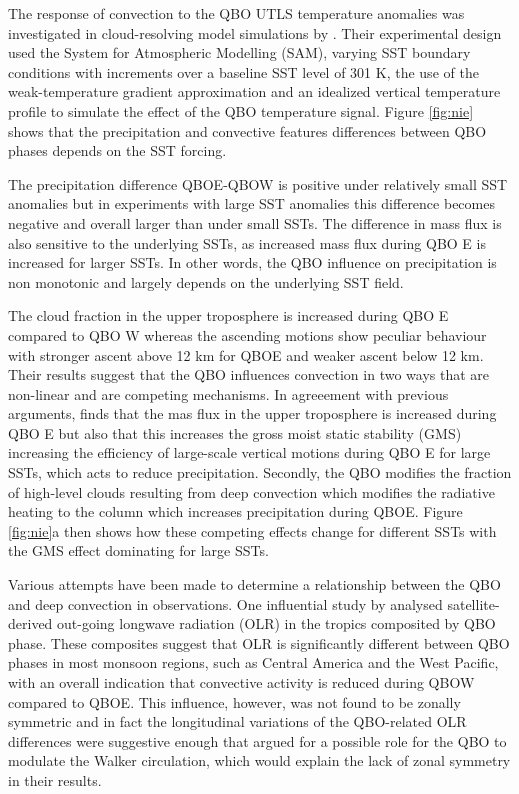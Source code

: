  The response of convection to the QBO UTLS temperature anomalies was investigated in cloud-resolving model simulations by \cite{nie2015}. Their experimental design used the System for Atmospheric Modelling (SAM), varying SST boundary conditions with increments over a baseline SST level of 301 K, the use of the weak-temperature gradient approximation and an idealized vertical temperature profile to simulate the effect of the QBO temperature signal. 
 Figure \ref{fig:nie} shows that the precipitation and convective features differences between QBO phases depends on the SST forcing.  
 
 The precipitation difference QBOE-QBOW is positive under relatively small SST anomalies but in experiments with large SST anomalies this difference becomes negative and overall larger than under small SSTs. The difference in mass flux is also sensitive to the underlying SSTs, as increased mass flux during QBO E is increased for larger SSTs.  In other words, the QBO influence on precipitation is non monotonic and largely depends on the underlying SST field.
 
  The cloud fraction in the upper troposphere is increased during QBO E compared to QBO W whereas the ascending motions show peculiar behaviour with stronger ascent above 12 km for QBOE and weaker ascent below 12 km. 
  Their results suggest that the QBO influences convection in two ways that are non-linear and are competing mechanisms. In agreeement with previous arguments, \cite{nie2015} finds that the mas flux in the upper troposphere is increased during QBO E but also that this increases the gross moist static stability (GMS) increasing the efficiency of large-scale vertical motions during QBO E for large SSTs, which acts to reduce precipitation.  Secondly, the QBO modifies the fraction of high-level clouds resulting from deep convection which modifies the radiative heating to the column which increases precipitation during QBOE.  Figure \ref{fig:nie}a then shows how these competing effects change for different SSTs with the GMS effect dominating for large SSTs.

Various attempts have been made to determine a relationship between the QBO and deep convection in observations. 
One influential study by \cite{collimore2003} analysed satellite-derived out-going longwave radiation (OLR) in the tropics composited by QBO phase. These composites suggest that OLR is significantly different between QBO phases in most monsoon regions, such as Central America  and the West Pacific, with an overall indication that convective activity is reduced during QBOW compared to QBOE. This influence, however, was not found to be zonally symmetric and in fact the longitudinal variations of the QBO-related OLR differences were suggestive enough that \cite{collimore2003} argued for a possible role for the QBO to modulate the Walker circulation, which would explain the lack of zonal symmetry in their results. 


